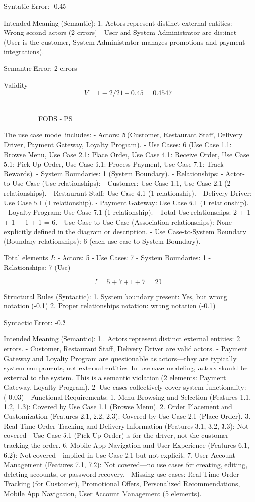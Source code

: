 Syntatic Error: -0.45

Intended Meaning (Semantic):
1. Actors represent distinct external entities: Wrong second actors (2 errors)
- User and System Administrator are distinct (User is the customer, System Administrator manages promotions and payment integrations). 

Semantic Error: 2 errors

Validity
\[
V = 1 - 2/21 - 0.45 = 0.4547
\]

====================================================
FODS - PS

The use case model includes:
- Actors: 5 (Customer, Restaurant Staff, Delivery Driver, Payment Gateway, Loyalty Program).
- Use Cases: 6 (Use Case 1.1: Browse Menu, Use Case 2.1: Place Order, Use Case 4.1: Receive Order, Use Case 5.1: Pick Up Order, Use Case 6.1: Process Payment, Use Case 7.1: Track Rewards).
- System Boundaries: 1 (System Boundary).
- Relationships:
- Actor-to-Use Case (Use relationships):
- Customer: Use Case 1.1, Use Case 2.1 (2 relationships).
- Restaurant Staff: Use Case 4.1 (1 relationship).
- Delivery Driver: Use Case 5.1 (1 relationship).
- Payment Gateway: Use Case 6.1 (1 relationship).
- Loyalty Program: Use Case 7.1 (1 relationship).
- Total Use relationships: 2 + 1 + 1 + 1 + 1 = 6.
- Use Case-to-Use Case (Association relationships): None explicitly defined in the diagram or description.
- Use Case-to-System Boundary (Boundary relationships): 6 (each use case to System Boundary).

Total elements \( I \):
- Actors: 5
- Use Cases: 7
- System Boundaries: 1
- Relationships: 7 (Use) 

\[
I = 5 + 7 + 1 + 7 = 20
\]

Structural Rules (Syntactic):
1. System boundary present: Yes, but wrong notation (-0.1)
2. Proper relationships notation: wrong notation (-0.1)

Syntactic Error:  -0.2

Intended Meaning (Semantic):
1.. Actors represent distinct external entities: 2 errors. 
- Customer, Restaurant Staff, Delivery Driver are valid actors.
- Payment Gateway and Loyalty Program are questionable as actors—they are typically system components, not external entities. In use case modeling, actors should be external to the system. This is a semantic violation (2 elements: Payment Gateway, Loyalty Program).
2. Use cases collectively cover system functionality: (-0.03)
- Functional Requirements:
1. Menu Browsing and Selection (Features 1.1, 1.2, 1.3): Covered by Use Case 1.1 (Browse Menu).
2. Order Placement and Customization (Features 2.1, 2.2, 2.3): Covered by Use Case 2.1 (Place Order).
3. Real-Time Order Tracking and Delivery Information (Features 3.1, 3.2, 3.3): Not covered—Use Case 5.1 (Pick Up Order) is for the driver, not the customer tracking the order.
6. Mobile App Navigation and User Experience (Features 6.1, 6.2): Not covered—implied in Use Case 2.1 but not explicit.
7. User Account Management (Features 7.1, 7.2): Not covered—no use cases for creating, editing, deleting accounts, or password recovery.
- Missing use cases: Real-Time Order Tracking (for Customer), Promotional Offers, Personalized Recommendations, Mobile App Navigation, User Account Management (5 elements).


